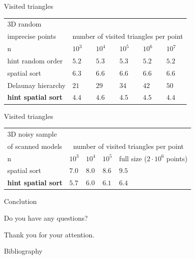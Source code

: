 \documentclass{beamer}
\begin{document}
\begin{frame}{Visited triangles}
\begin{tabular}{|l||l|l|l|l|l|}
\hline
3D random \\
imprecise points & \multicolumn{5}{|c|}{number of visited triangles per point}\\
 \hline \hline
    n & $10^3$ & $10^4$ & $10^5$ & $10^6$ & $10^7$ \\\hline
    hint random order & $5.2 $ & $5.3 $ & $5.3$ & $5.2$ & $5.2$\\\hline
    spatial sort & $6.3$ & $6.6$ & $6.6$ & $6.6$ & $6.6$ \\\hline
    Delaunay hierarchy & $21$ & $29$ & $34$ & $42$ & $50$\\\hline
    \textbf{hint spatial sort} & $4.4$ & $4.6$ & $4.5$ & $4.5$ & $4.4$\\\hline
\end{tabular}
\end{frame}

\begin{frame}{Visited triangles}
\begin{tabular}{|l||l|l|l|l|}
\hline
3D noisy sample \\
of scanned models& \multicolumn{4}{|c|}{number of visited triangles per point}\\
 \hline \hline
    n & $10^3$ & $10^4$ & $10^5$ & full size ($2 \cdot 10^6$ points)\\\hline
    spatial sort & $7.0$ & $8.0$ & $8.6$ & $9.5$\\\hline
    \textbf{hint spatial sort} & $5.7$ & $6.0$ & $6.1$ & $6.4$\\\hline
\end{tabular}
\end{frame}

\begin{frame}{Conclution}

\end{frame}

\begin{frame}
\centering
\huge{Do you have any questions?}\\
\pause
\vspace*{1.5cm}
\centerline{\large{Thank you for your attention.}}
\end{frame}

\begin{frame}{Bibliography}
  
\nocite{*}

\end{frame}
\end{document}
